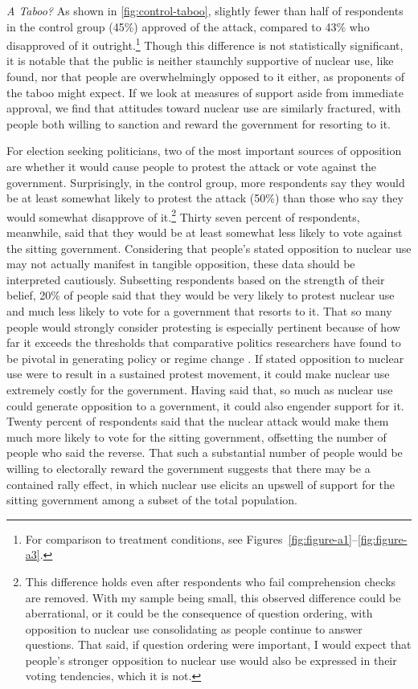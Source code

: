 \documentclass[12pt]{article}
\begin{document}
\textit{A Taboo?} As shown in \autoref{fig:control-taboo}, slightly fewer than half of respondents in the control group (45\%) approved of the attack, compared to 43\% who disapproved of it outright.\footnote{For comparison to treatment conditions, see Figures~\ref{fig:figure-a1}--\ref{fig:figure-a3}.} Though this difference is not statistically significant, it is notable that the public is neither staunchly supportive of nuclear use, like \cite{sagan_revisiting_2017} found, nor that people are overwhelmingly opposed to it either, as proponents of the taboo might expect. If we look at measures of support aside from immediate approval, we find that attitudes toward nuclear use are similarly fractured, with people both willing to sanction and reward the government for resorting to it.



For election seeking politicians, two of the most important sources of opposition are whether it would cause people to protest the attack or vote against the government. Surprisingly, in the control group, more respondents say they would be at least somewhat likely to protest the attack (50\%) than those who say they would somewhat disapprove of it.\footnote{This difference holds even after respondents who fail comprehension checks are removed. With my sample being small, this observed difference could be aberrational, or it could be the consequence of question ordering, with opposition to nuclear use consolidating as people continue to answer questions. That said, if question ordering were important, I would expect that people's stronger opposition to nuclear use would also be expressed in their voting tendencies, which it is not.} Thirty seven percent of respondents, meanwhile, said that they would be at least somewhat less likely to vote against the sitting government. Considering that people's stated opposition to nuclear use may not actually manifest in tangible opposition, these data should be interpreted cautiously. Subsetting respondents based on the strength of their belief,  20\% of people said that they would be very likely to protest nuclear use and much less likely to vote for a government that resorts to it. That so many people would strongly consider protesting is especially pertinent because of how far it exceeds the thresholds that comparative politics researchers have found to be pivotal in generating policy or regime change \citep{chenoweth_physics_2019}. If stated opposition to nuclear use were to result in a sustained protest movement, it could make nuclear use extremely costly for the government. Having said that, so much as nuclear use could generate opposition to a government, it could also engender support for it. Twenty percent of respondents said that the nuclear attack would make them much more likely to vote for the sitting government, offsetting the number of people who said the reverse. That such a substantial number of people would be willing to electorally reward the government suggests that there may be a contained rally effect, in which nuclear use elicits an upswell of support for the sitting government among a subset of the total population.
\end{document}
